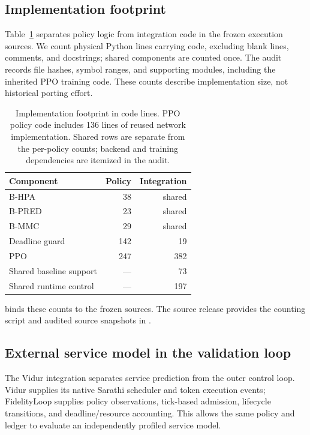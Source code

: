 

\subsection{Implementation footprint}
Table~\ref{tab:implementation-footprint} separates policy logic from
integration code in the frozen execution sources. We count physical Python
lines carrying code, excluding blank lines, comments, and docstrings;
shared components are counted once. The audit records file hashes,
symbol ranges, and supporting modules, including the inherited PPO
training code. These counts describe implementation size, not historical porting effort.

\begin{table}[t]
\centering
\small
\caption{Implementation footprint in code lines. PPO policy code includes
136 lines of reused network implementation. Shared rows are separate
from the per-policy counts; backend and training dependencies are
itemized in the audit.}
\label{tab:implementation-footprint}
\setlength{\tabcolsep}{3pt}
\par\vspace{4pt}
\begin{tabular*}{\linewidth}{@{\extracolsep{\fill}}lrr@{}}
\toprule
Component & Policy & Integration\\
\midrule
B-HPA & 38 & shared\\
B-PRED & 23 & shared\\
B-MMC & 29 & shared\\
Deadline guard & 142 & 19\\
PPO & 247 & 382\\
\midrule
Shared baseline support & --- & 73\\
Shared runtime control & --- & 197\\
\bottomrule
\end{tabular*}
\end{table}

 binds these counts to the frozen
sources. The source release provides the counting script and audited
source snapshots in .

\subsection{External service model in the validation loop}
\label{app:vidur}
The Vidur integration separates service prediction from the outer control
loop. Vidur \citep{vidur2024} supplies its native Sarathi scheduler and token
execution events; FidelityLoop supplies policy observations, tick-based
admission, lifecycle transitions, and deadline/resource accounting. This
allows the same policy and ledger to evaluate an independently profiled
service model.

